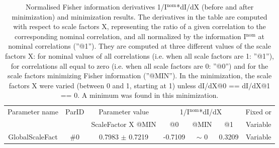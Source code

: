 \begin{table}[H]
\scriptsize
\begin{center}
\renewcommand{\arraystretch}{1.1}
\begin{tabular}{|c|c|c|ccc|c|}
\hline
Parameter name & ParID & Parameter value &\multicolumn{3}{|c|}{1/I$^\mathrm{nom}$*dI/dX} & Fixed or\\
 & & ScaleFactor X @MIN & @0 & @MIN & @1 & Variable\\
\hline
 {\tiny GlobalScaleFact} & \#0 &    0.7983 $\pm$    0.7219 &   -0.7109 & {\tiny $\sim$ }0 &    0.3209 & Variable \\
\hline
\end{tabular}
\renewcommand{\arraystretch}{1}
\caption{Normalised Fisher information derivatives 1/I$^\mathrm{nom}$*dI/dX (before and after minimization) and minimization results.  The derivatives in the table are computed with respect to scale factors X, representing the ratio of a given correlation to the corresponding nominal correlation, and all normalized by the information I$^\mathrm{nom}$ at nominal correlations (''@1''). They are computed at three different values of the scale factors X: for nominal values of all correlations (i.e. when all scale factors are 1: ''@1''), for correlations all equal to zero (i.e. when all scale factors are 0: ''@0'') and for the scale factors minimizing Fisher information (''@MIN''). In the minimization, the scale factors X were varied (between 0 and 1, starting at 1) unless dI/dX@0 == dI/dX@1 == 0. A minimum was found in this minimization.}
\end{center}
\end{table}
